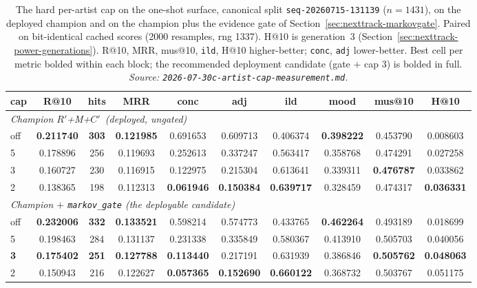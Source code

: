 \documentclass[11pt]{article}
\newcommand{\dsid}[1]{\texttt{\small #1}}
\newcommand{\best}[1]{\textbf{#1}}
\newcommand{\Rp}{\ensuremath{R'}}
\newcommand{\Cp}{\ensuremath{C'}}
\begin{document}
\begin{table}[ht]
  \centering
  \caption{The hard per-artist cap on the one-shot surface, canonical split
  \dsid{seq-20260715-131139} ($n=\num{1431}$), on the deployed champion and on the
  champion plus the evidence gate of Section~\ref{sec:nexttrack-markovgate}. Paired
  on bit-identical cached scores (\num{2000} resamples, rng \num{1337}). H@10 is
  generation~3 (Section~\ref{sec:nexttrack-power-generations}). R@10, MRR, mus@10,
  \texttt{ild}, H@10 higher-better; \texttt{conc}, \texttt{adj} lower-better. Best
  cell per metric bolded within each block; the recommended deployment candidate
  (gate $+$ cap 3) is bolded in full.
  \emph{Source: \texttt{2026-07-30c-artist-cap-measurement.md}.}}
  \label{tab:nexttrack-artistcap}
  {\footnotesize\setlength{\tabcolsep}{4pt}\begin{tabular}{lccccccccc}
    \toprule
    cap & R@10 & hits & MRR & conc & adj & ild & mood & mus@10 & H@10 \\
    \midrule
    \multicolumn{10}{l}{\emph{Champion \Rp+M+\Cp\ (deployed, ungated)}} \\
    off & \best{0.211740} & \best{303} & \best{0.121985} & 0.691653 & 0.609713 & 0.406374 & \best{0.398222} & 0.453790 & 0.008603 \\
    5   & 0.178896 & 256 & 0.119693 & 0.252613 & 0.337247 & 0.563417 & 0.358768 & 0.474291 & 0.027258 \\
    3   & 0.160727 & 230 & 0.116915 & 0.122975 & 0.215304 & 0.613641 & 0.339311 & \best{0.476787} & 0.033862 \\
    2   & 0.138365 & 198 & 0.112313 & \best{0.061946} & \best{0.150384} & \best{0.639717} & 0.328459 & 0.474317 & \best{0.036331} \\
    \midrule
    \multicolumn{10}{l}{\emph{Champion $+$ \texttt{markov\_gate} (the deployable candidate)}} \\
    off & \best{0.232006} & \best{332} & \best{0.133521} & 0.598214 & 0.574773 & 0.433765 & \best{0.462264} & 0.493189 & 0.018699 \\
    5   & 0.198463 & 284 & 0.131137 & 0.231338 & 0.335849 & 0.580367 & 0.413910 & 0.505703 & 0.040056 \\
    \best{3} & \best{0.175402} & \best{251} & \best{0.127788} & \best{0.113440} & 0.217191 & 0.631939 & 0.386846 & \best{0.505762} & \best{0.048063} \\
    2   & 0.150943 & 216 & 0.122627 & \best{0.057365} & \best{0.152690} & \best{0.660122} & 0.368732 & 0.503767 & 0.051175 \\
    \bottomrule
  \end{tabular}}
\end{table}
\end{document}
